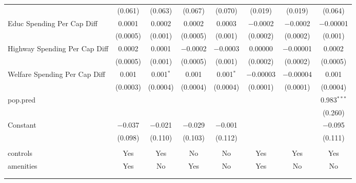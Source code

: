 \begin{table}[!htbp]
\begin{tabular}{@{\extracolsep{5pt}}lccccccc}
  & (0.061) & (0.063) & (0.067) & (0.070) & (0.019) & (0.019) & (0.064) \\ 
  Educ Spending Per Cap Diff & 0.0001 & 0.0002 & 0.0002 & 0.0003 & $-$0.0002 & $-$0.0002 & $-$0.00001 \\ 
  & (0.0005) & (0.001) & (0.0005) & (0.001) & (0.0002) & (0.0002) & (0.001) \\ 
  Highway Spending Per Cap Diff & 0.0002 & 0.0001 & $-$0.0002 & $-$0.0003 & 0.00000 & $-$0.00001 & 0.0002 \\ 
  & (0.0005) & (0.001) & (0.0005) & (0.001) & (0.0002) & (0.0002) & (0.0005) \\ 
  Welfare Spending Per Cap Diff & 0.001 & 0.001$^{*}$ & 0.001 & 0.001$^{*}$ & $-$0.00003 & $-$0.00004 & 0.001 \\ 
  & (0.0003) & (0.0004) & (0.0004) & (0.0004) & (0.0001) & (0.0001) & (0.0004) \\ 
  pop.pred &  &  &  &  &  &  & 0.983$^{***}$ \\ 
  &  &  &  &  &  &  & (0.260) \\ 
  Constant & $-$0.037 & $-$0.021 & $-$0.029 & $-$0.001 &  &  & $-$0.095 \\ 
  & (0.098) & (0.110) & (0.103) & (0.112) &  &  & (0.111) \\ 
 \hline \\[-1.8ex] 
controls & Yes & Yes & No & No & Yes & Yes & Yes \\ 
amenities & Yes & No & Yes & No & Yes & No & No \\ 
\hline \\[-1.8ex] 
\hline 
\hline \\[-1.8ex] 
\end{tabular} 
\end{table} 
